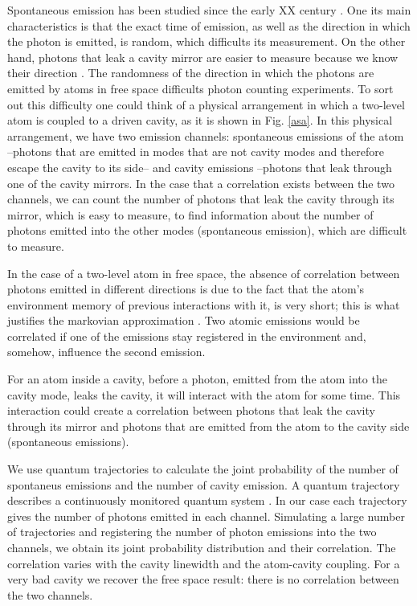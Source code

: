 \documentclass[%
 reprint,
 amsmath,amssymb,
 aps, 
]{revtex4-1}
\begin{document}
Spontaneous emission has been studied since the early XX century
\cite{10.2307/94746, 1917PhyZ...18..121E}. One its main
characteristics is that the exact time of emission, as well as the
direction in which the photon is emitted, is random, which difficults
its measurement. On the other hand, photons that leak a cavity mirror
are easier to measure because we know their direction \cite{326305,
  doi:10.1063/1.113345}. The randomness of the direction in which the
photons are emitted by atoms in free space difficults photon counting
experiments. To sort out this difficulty one could think of a physical
arrangement in which a two-level atom is coupled to a driven cavity,
as it is shown in Fig. \ref{asa}. In this physical arrangement, we
have two emission channels: spontaneous emissions of the atom
--photons that are emitted in modes that are not cavity modes and
therefore escape the cavity to its side-- and cavity emissions
--photons that leak through one of the cavity mirrors. In the case
that a correlation exists between the two channels, we can count the
number of photons that leak the cavity through its mirror, which is
easy to measure, to find information about the number of photons
emitted into the other modes (spontaneous emission), which are
difficult to measure.

In the case of a two-level atom in free space, the absence of
correlation between photons emitted in different directions is due to
the fact that the atom's environment memory of previous interactions
with it, is very short; this is what justifies the markovian
approximation \cite{daley2014quantum}. Two atomic emissions would be
correlated if one of the emissions stay registered in the environment
and, somehow, influence the second emission.

For an atom inside a cavity, before a photon, emitted from the atom
into the cavity mode, leaks the cavity, it will interact with the atom
for some time. This interaction could create a correlation between
photons that leak the cavity through its mirror and photons that are
emitted from the atom to the cavity side (spontaneous emissions).

We use quantum trajectories to calculate the joint probability of the
number of spontaneus emissions and the number of cavity emission. A
quantum trajectory describes a continuously monitored quantum system
\cite{Carmichael1993Open}. In our case each trajectory gives the
number of photons emitted in each channel. Simulating a large number
of trajectories and registering the number of photon emissions into
the two channels, we obtain its joint probability distribution and
their correlation. The correlation varies with the cavity linewidth
and the atom-cavity coupling. For a very bad cavity we recover the
free space result: there is no correlation between the two channels.
\end{document}
